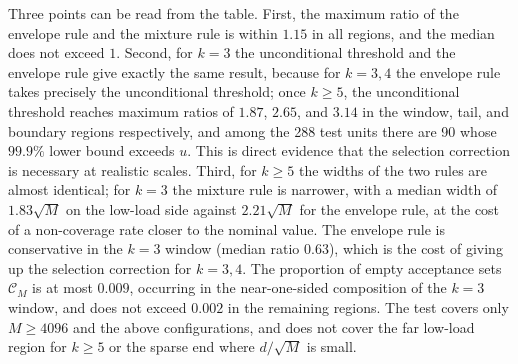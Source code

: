 Three points can be read from the table. First, the maximum ratio of the envelope rule and the mixture rule is within $1.15$ in all regions, and the median does not exceed $1$. Second, for $k=3$ the
unconditional threshold and the envelope rule give exactly the same result, because for $k=3,4$ the envelope rule takes precisely the
unconditional threshold; once $k\ge5$, the unconditional threshold reaches maximum ratios of $1.87$, $2.65$, and $3.14$ in the
window, tail, and boundary regions respectively, and among the 288 test units there are 90 whose $99.9\%$ lower bound exceeds
$u$. This is direct evidence that the selection correction is necessary at realistic scales. Third, for $k\ge5$ the widths of the two rules are almost identical; for $k=3$ the mixture rule is narrower,
with a median width of $1.83\sqrt M$ on the low-load side against $2.21\sqrt M$ for the envelope rule, at the cost of a non-coverage rate closer to the nominal value. The envelope rule is conservative in the $k=3$
window (median ratio $0.63$), which is the cost of giving up the selection correction for $k=3,4$. The proportion of empty acceptance sets $\mathcal C_M$ is at most
$0.009$, occurring in the near-one-sided composition of the $k=3$ window, and does not exceed $0.002$ in the remaining regions. The test covers only $M\ge4096$ and the above configurations,
and does not cover the far low-load region for $k\ge5$ or the sparse end where $d/\sqrt M$ is small.
